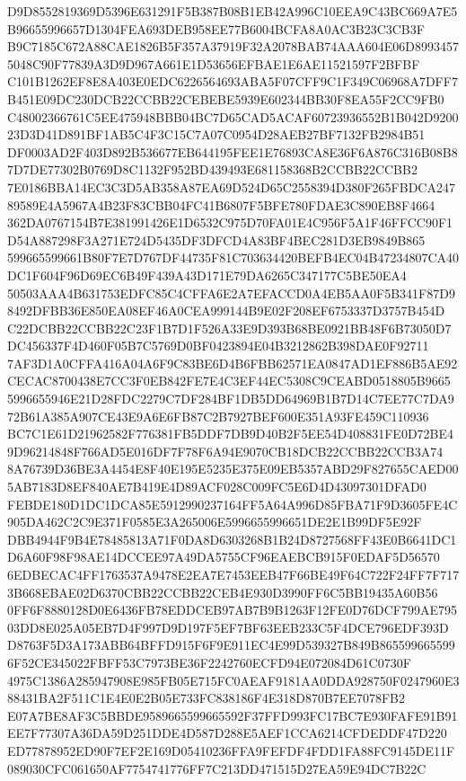 \documentclass[UTF8,fontset=fandol,zihao=-4,a4paper]{ctexart}
\begin{document}
{{D9D8552819369D5396E631291F5B387B08B1EB42A996C10EEA9C43BC669A7E5B96655996657D1304FEA693DEB958EE77B6004BCFA8A0AC3B23C3CB3F
B9C7185C672A88CAE1826B5F357A37919F32A2078BAB74AAA604E06D89934575048C90F77839A3D9D967A661E1D53656EFBAE1E6AE11521597F2BFBF
C101B1262EF8E8A403E0EDC6226564693ABA5F07CFF9C1F349C06968A7DFF7B451E09DC230DCB22CCBB22CEBEBE5939E602344BB30F8EA55F2CC9FB0
C48002366761C5EE475948BBB04BC7D65CAD5ACAF60723936552B1B042D920023D3D41D891BF1AB5C4F3C15C7A07C0954D28AEB27BF7132FB2984B51
DF0003AD2F403D892B536677EB644195FEE1E76893CA8E36F6A876C316B08B87D7DE77302B0769D8C1132F952BD439493E681158368B2CCBB22CCBB2
7E0186BBA14EC3C3D5AB358A87EA69D524D65C2558394D380F265FBDCA24789589E4A5967A4B23F83CBB04FC41B6807F5BFE780FDAE3C890EB8F4664
362DA0767154B7E381991426E1D6532C975D70FA01E4C956F5A1F46FFCC90F1D54A887298F3A271E724D5435DF3DFCD4A83BF4BEC281D3EB9849B865
599665599661B80F7E7D767DF44735F81C703634420BEFB4EC04B47234807CA40DC1F604F96D69EC6B49F439A43D171E79DA6265C347177C5BE50EA4
50503AAA4B631753EDFC85C4CFFA6E2A7EFACCD0A4EB5AA0F5B341F87D98492DFBB36E850EA08EF46A0CEA999144B9E02F208EF6753337D3757B454D
C22DCBB22CCBB22C23F1B7D1F526A33E9D393B68BE0921BB48F6B73050D7DC456337F4D460F05B7C5769D0BF0423894E04B3212862B398DAE0F92711
7AF3D1A0CFFA416A04A6F9C83BE6D4B6FBB62571EA0847AD1EF886B5AE92CECAC8700438E7CC3F0EB842FE7E4C3EF44EC5308C9CEABD0518805B9665
5996655946E21D28FDC2279C7DF284BF1DB5DD64969B1B7D14C7EE77C7DA972B61A385A907CE43E9A6E6FB87C2B7927BEF600E351A93FE459C110936
BC7C1E61D21962582F776381FB5DDF7DB9D40B2F5EE54D408831FE0D72BE49D96214848F766AD5E016DF7F78F6A94E9070CB18DCB22CCBB22CCB3A74
8A76739D36BE3A4454E8F40E195E5235E375E09EB5357ABD29F827655CAED005AB7183D8EF840AE7B419E4D89ACF028C009FC5E6D4D43097301DFAD0
FEBDE180D1DC1DCA85E5912990237164FF5A64A996D85FBA71F9D3605FE4C905DA462C2C9E371F0585E3A265006E5996655996651DE2E1B99DF5E92F
DBB4944F9B4E78485813A71F0DA8D6303268B1B24D8727568FF43E0B6641DC1D6A60F98F98AE14DCCEE97A49DA5755CF96EAEBCB915F0EDAF5D56570
6EDBECAC4FF1763537A9478E2EA7E7453EEB47F66BE49F64C722F24FF7F7173B668EBAE02D6370CBB22CCBB22CEB4E930D3990FF6C5BB19435A60B56
0FF6F8880128D0E6436FB78EDDCEB97AB7B9B1263F12FE0D76DCF799AE79503DD8E025A05EB7D4F997D9D197F5EF7BF63EEB233C5F4DCE796EDF393D
D8763F5D3A173ABB64BFFD915F6F9E911EC4E99D539327B849B8655996655996F52CE345022FBFF53C7973BE36F2242760ECFD94E072084D61C0730F
4975C1386A285947908E985FB05E715FC0AEAF9181AA0DDA928750F0247960E388431BA2F511C1E4E0E2B05E733FC838186F4E318D870B7EE7078FB2
E07A7BE8AF3C5BBDE9589665599665592F37FFD993FC17BC7E930FAFE91B91EE7F77307A36DA59D251DDE4D587D288E5AEF1CCA6214CFDEDDF47D220
ED77878952ED90F7EF2E169D05410236FFA9FEFDF4FDD1FA88FC9145DE11F089030CFC061650AF7754741776FF7C213DD471515D27EA59E94DC7B22C
}}
\end{document}
